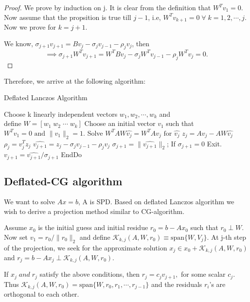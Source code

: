\documentclass[10pt,a4paper]{article}
\begin{document}
\begin{proof}
We prove by induction on j. It is clear from the definition that $W^Tv_1=0.$ Now assume that the propsition is true till $j-1$, i.e, $W^Tv_{k+1}=0\;\forall\;k=1,2,\cdots,j.$ Now we prove for $k=j+1.$ 

We know, $\sigma_{j+1}v_{j+1}=Bv_j-\sigma_jv_{j-1}-\rho_jv_j$, then
$$\implies \sigma_{j+1}W^Tv_{j+1} = W^TBv_j-\sigma_jW^Tv_{j-1}-\rho_jW^Tv_j=0.$$
\end{proof}

Therefore, we arrive at the following algorithm:

\begin{algorithm}
\caption{Deflated Lanczos Algorithm}
\begin{algorithmic}[1]
\State Choose k linearly independent vectors $w_1,w_2,\cdots,w_k$ and \\ \qquad define $W=[w_1\;w_2\;\cdots\;w_k]$
\State Choose an initial vector $v_1$ such that $W^Tv_1=0\text{ and }\|v_1\|_2=1.$
	\State Solve $W^TAW\hat{v_j}=W^TAv_j\text{ for }\hat{v_j}$
	\State $z_j=Av_j-AW\hat{v_j}$
	\State $\rho_j=v^T_jz_j$
	\State $\hat{v_{j+1}}=z_j-\sigma_jv_{j-1}-\rho_jv_j$
	\State $\sigma_{j+1}=\|\hat{v_{j+1}}\|_2$; If $\sigma_{j+1}=0$ Exit.
	\State $v_{j+1}=\hat{v_{j+1}}/\sigma_{j+1}$
\EndFor
\State EndDo
\end{algorithmic}
\end{algorithm}

\subsection{Deflated-CG algorithm}

We want to solve $Ax=b$, A is SPD. Based on deflated Lanczos algorithm we wish to derive a projection method similar to CG-algorithm. 

Assume $x_0$ is the initial guess and initial residue $r_0=b-Ax_0$ such that $r_0\perp W.$ Now set $v_1=r_0/\|r_0\|_2$ and define $\mathcal{K}_{k,j}(A,W,r_0)\equiv\text{span}\{W,V_j\}$. At j-th step of the projection, we seek for the approximate solution $x_j\in x_0+\mathcal{K}_{k,j}(A,W,r_0)$ and $r_j=b-Ax_j\perp \mathcal{K}_{k,j}(A,W,r_0).$

\begin{lemma}
If $x_j\;and\;r_j$ satisfy the above conditions, then $r_j=c_jv_{j+1},$ for some scalar $c_j$. Thus $\mathcal{K}_{k,j}(A,W,r_0)=\text{span}\{W,r_0,r_1,\cdots,r_{j-1}\}$ and the residuals $r_i$'s are orthogonal to each other.
\end{lemma}
\end{document}
